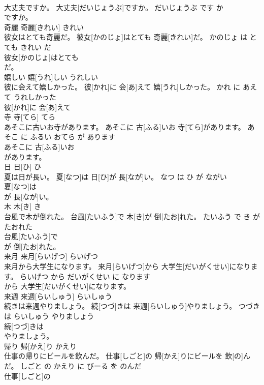 \documentclass[8pt]{extreport}
\begin{document}
\begin{CJK}{UTF8}{min}
\\	大丈夫ですか。	大丈夫[だいじょうぶ]ですか。	だいじょうぶ です か	
\\	ですか。			
\\	奇麗	奇麗[きれい]	きれい	
\\	彼女はとても奇麗だ。	彼女[かのじょ]はとても 奇麗[きれい]だ。	かのじょ は とても きれい だ	
\\	彼女[かのじょ]はとても
\\	だ。			
\\	嬉しい	嬉[うれ]しい	うれしい	
\\	彼に会えて嬉しかった。	彼[かれ]に 会[あ]えて 嬉[うれ]しかった。	かれ に あえて うれしかった	
\\	彼[かれ]に 会[あ]えて
\\	寺	寺[てら]	てら	
\\	あそこに古いお寺があります。	あそこに 古[ふる]いお 寺[てら]があります。	あそこ に ふるい おてら が あります	
\\	あそこに 古[ふる]いお
\\	があります。			
\\	日	日[ひ]	ひ	
\\	夏は日が長い。	夏[なつ]は 日[ひ]が 長[なが]い。	なつ は ひ が ながい	
\\	夏[なつ]は
\\	が 長[なが]い。			
\\	木	木[き]	き	
\\	台風で木が倒れた。	台風[たいふう]で 木[き]が 倒[たお]れた。	たいふう で き が たおれた	
\\	台風[たいふう]で
\\	が 倒[たお]れた。			
\\	来月	来月[らいげつ]	らいげつ	
\\	来月から大学生になります。	来月[らいげつ]から 大学生[だいがくせい]になります。	らいげつ から だいがくせい に なります	
\\	から 大学生[だいがくせい]になります。			
\\	来週	来週[らいしゅう]	らいしゅう	
\\	続きは来週やりましょう。	続[つづ]きは 来週[らいしゅう]やりましょう。	つづき は らいしゅう やりましょう	
\\	続[つづ]きは
\\	やりましょう。			
\\	帰り	帰[かえ]り	かえり	
\\	仕事の帰りにビールを飲んだ。	仕事[しごと]の 帰[かえ]りにビールを 飲[の]んだ。	しごと の かえり に びーる を のんだ	
\\	仕事[しごと]の

\end{CJK}
\end{document}
